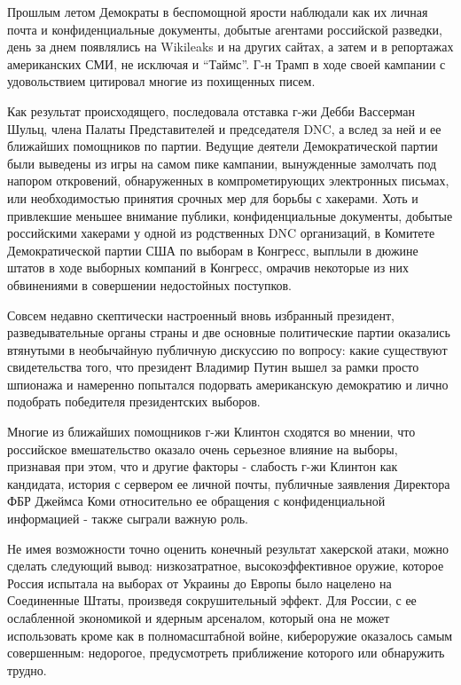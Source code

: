 Прошлым летом Демократы в беспомощной ярости наблюдали как их личная
почта и конфиденциальные документы, добытые агентами российской
разведки, день за днем появлялись на Wikileaks и на других сайтах, а
затем и в репортажах американских СМИ, не исключая и ``Таймс''. Г-н
Трамп в ходе своей кампании с удовольствием цитировал многие из
похищенных писем.

Как результат происходящего, последовала отставка г-жи Дебби Вассерман
Шульц, члена Палаты Представителей и председателя DNC, а вслед за ней и
ее ближайших помощников по партии. Ведущие деятели Демократической
партии были выведены из игры на самом пике кампании, вынужденные
замолчать под напором откровений, обнаруженных в компрометирующих
электронных письмах, или необходимостью принятия срочных мер для борьбы
с хакерами. Хоть и привлекшие меньшее внимание публики, конфиденциальные
документы, добытые российскими хакерами у одной из родственных DNC
организаций, в Комитете Демократической партии США по выборам в
Конгресс, выплыли в дюжине штатов в ходе выборных компаний в Конгресс,
омрачив некоторые из них обвинениями в совершении недостойных поступков.

Совсем недавно скептически настроенный вновь избранный президент,
разведывательные органы страны и две основные политические партии
оказались втянутыми в необычайную публичную дискуссию по вопросу: какие
существуют свидетельства того, что президент Владимир Путин вышел за
рамки просто шпионажа и намеренно попытался подорвать американскую
демократию и лично подобрать победителя президентских выборов.

Многие из ближайших помощников г-жи Клинтон сходятся во мнении, что
российское вмешательство оказало очень серьезное влияние на выборы,
признавая при этом, что и другие факторы - слабость г-жи Клинтон как
кандидата, история с сервером ее личной почты, публичные заявления
Директора ФБР Джеймса Коми относительно ее обращения с конфиденциальной
информацией - также сыграли важную роль.

Не имея возможности точно оценить конечный результат хакерской атаки,
можно сделать следующий вывод: низкозатратное, высокоэффективное оружие,
которое Россия испытала на выборах от Украины до Европы было нацелено на
Соединенные Штаты, произведя сокрушительный эффект. Для России, с ее
ослабленной экономикой и ядерным арсеналом, который она не может
использовать кроме как в полномасштабной войне, кибероружие оказалось
самым совершенным: недорогое, предусмотреть приближение которого или
обнаружить трудно.

